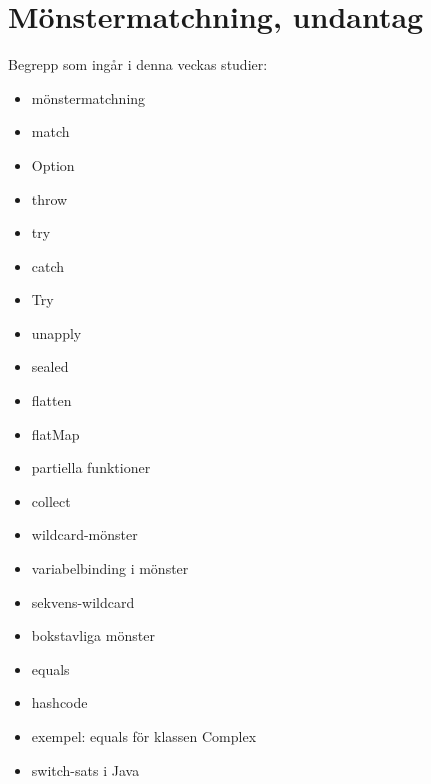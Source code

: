 \chapter{Mönstermatchning, undantag}\label{chapter:W10}
Begrepp som ingår i denna veckas studier:
\begin{itemize}[noitemsep,label={$\square$},leftmargin=*]
\item mönstermatchning
\item match
\item Option
\item throw
\item try
\item catch
\item Try
\item unapply
\item sealed
\item flatten
\item flatMap
\item partiella funktioner
\item collect
\item wildcard-mönster
\item variabelbinding i mönster
\item sekvens-wildcard
\item bokstavliga mönster
\item equals
\item hashcode
\item exempel: equals för klassen Complex
\item switch-sats i Java\end{itemize}
